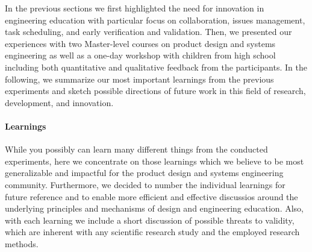 \documentclass{PDS}
\begin{document}
In the previous sections we first highlighted the need for innovation in engineering education with particular focus on collaboration, issues management, task scheduling, and early verification and validation.
Then, we presented our experiences with two Master-level courses on product design and systems engineering as well as a one-day workshop with children from high school including both quantitative and qualitative feedback from the participants.
In the following, we summarize our most important learnings from the previous experiments and sketch possible directions of future work in this field of research, development, and innovation.

\paragraph{Learnings}

While you possibly can learn many different things from the conducted experiments, here we concentrate on those learnings which we believe to be most generalizable and impactful for the product design and systems engineering community.
Furthermore, we decided to number the individual learnings for future reference and to enable more efficient and effective discussios around the underlying principles and mechanisms of design and engineering education.
Also, with each learning we include a short discussion of possible threats to validity, which are inherent with any scientific research study and the employed research methods.
\end{document}
